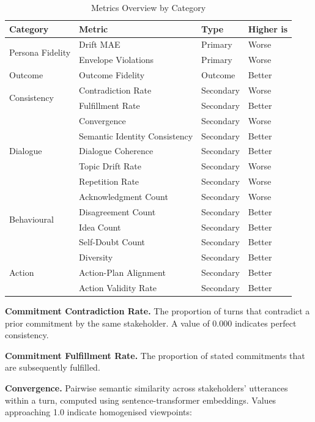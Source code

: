 \documentclass[12pt, a4paper]{report}
\begin{document}
\begin{table}[t]
\centering
\caption{Metrics Overview by Category}
\label{tab:metrics_overview}
\small
\begin{tabular}{llll}
\toprule
Category & Metric & Type & Higher is \\
\midrule
\multirow{2}{*}{Persona Fidelity}
    & Drift MAE & Primary & Worse \\
    & Envelope Violations & Primary & Worse \\
\midrule
Outcome & Outcome Fidelity & Outcome & Better \\
\midrule
\multirow{2}{*}{Consistency}
    & Contradiction Rate & Secondary & Worse \\
    & Fulfillment Rate & Secondary & Better \\
\midrule
\multirow{5}{*}{Dialogue}
    & Convergence & Secondary & Worse \\
    & Semantic Identity Consistency & Secondary & Better \\
    & Dialogue Coherence & Secondary & Better \\
    & Topic Drift Rate & Secondary & Worse \\
    & Repetition Rate & Secondary & Worse \\
\midrule
\multirow{4}{*}{Behavioural}
    & Acknowledgment Count & Secondary & Worse \\
    & Disagreement Count & Secondary & Better \\
    & Idea Count & Secondary & Better \\
    & Self-Doubt Count & Secondary & Better \\
\midrule
\multirow{3}{*}{Action}
    & Diversity & Secondary & Better \\
    & Action-Plan Alignment & Secondary & Better \\
    & Action Validity Rate & Secondary & Better \\
\bottomrule
\end{tabular}
\end{table}

\textbf{Commitment Contradiction Rate.} The proportion of turns that contradict a prior commitment by the same stakeholder. A value of 0.000 indicates perfect consistency.

\textbf{Commitment Fulfillment Rate.} The proportion of stated commitments that are subsequently fulfilled.

\textbf{Convergence.} Pairwise semantic similarity across stakeholders' utterances within a turn, computed using sentence-transformer embeddings. Values approaching 1.0 indicate homogenised viewpoints:
\end{document}
